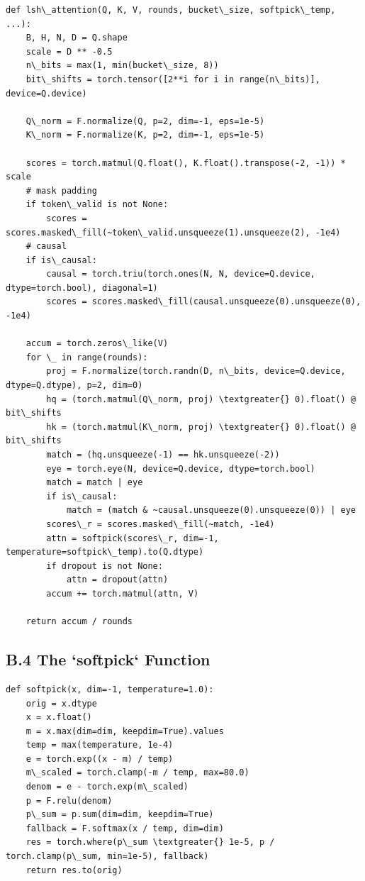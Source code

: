 \begin{lstlisting}
def lsh\_attention(Q, K, V, rounds, bucket\_size, softpick\_temp, ...):
    B, H, N, D = Q.shape
    scale = D ** -0.5
    n\_bits = max(1, min(bucket\_size, 8))
    bit\_shifts = torch.tensor([2**i for i in range(n\_bits)], device=Q.device)
    
    Q\_norm = F.normalize(Q, p=2, dim=-1, eps=1e-5)
    K\_norm = F.normalize(K, p=2, dim=-1, eps=1e-5)
    
    scores = torch.matmul(Q.float(), K.float().transpose(-2, -1)) * scale
    # mask padding
    if token\_valid is not None:
        scores = scores.masked\_fill(~token\_valid.unsqueeze(1).unsqueeze(2), -1e4)
    # causal
    if is\_causal:
        causal = torch.triu(torch.ones(N, N, device=Q.device, dtype=torch.bool), diagonal=1)
        scores = scores.masked\_fill(causal.unsqueeze(0).unsqueeze(0), -1e4)
    
    accum = torch.zeros\_like(V)
    for \_ in range(rounds):
        proj = F.normalize(torch.randn(D, n\_bits, device=Q.device, dtype=Q.dtype), p=2, dim=0)
        hq = (torch.matmul(Q\_norm, proj) \textgreater{} 0).float() @ bit\_shifts
        hk = (torch.matmul(K\_norm, proj) \textgreater{} 0).float() @ bit\_shifts
        match = (hq.unsqueeze(-1) == hk.unsqueeze(-2))
        eye = torch.eye(N, device=Q.device, dtype=torch.bool)
        match = match | eye
        if is\_causal:
            match = (match & ~causal.unsqueeze(0).unsqueeze(0)) | eye
        scores\_r = scores.masked\_fill(~match, -1e4)
        attn = softpick(scores\_r, dim=-1, temperature=softpick\_temp).to(Q.dtype)
        if dropout is not None:
            attn = dropout(attn)
        accum += torch.matmul(attn, V)
    
    return accum / rounds
\end{lstlisting}

\subsection{B.4 The `softpick` Function}

\begin{lstlisting}
def softpick(x, dim=-1, temperature=1.0):
    orig = x.dtype
    x = x.float()
    m = x.max(dim=dim, keepdim=True).values
    temp = max(temperature, 1e-4)
    e = torch.exp((x - m) / temp)
    m\_scaled = torch.clamp(-m / temp, max=80.0)
    denom = e - torch.exp(m\_scaled)
    p = F.relu(denom)
    p\_sum = p.sum(dim=dim, keepdim=True)
    fallback = F.softmax(x / temp, dim=dim)
    res = torch.where(p\_sum \textgreater{} 1e-5, p / torch.clamp(p\_sum, min=1e-5), fallback)
    return res.to(orig)
\end{lstlisting}

